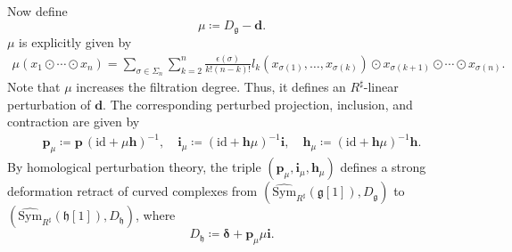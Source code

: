 \documentclass[12pt]{amsart}
\newtheorem{rmk}[defn]{Remark}
\numberwithin{equation}{section}
\theoremstyle{plain}
\newcommand{\bfd}{\mathbf{d}}
\newcommand{\bfi}{\mathbf{i}}
\newcommand{\bfh}{\mathbf{h}}
\newcommand{\bfp}{\mathbf{p}}
\newcommand{\bfdelta}{\bm{\delta}}
\newcommand{\fg}{\mathfrak{g}}
\newcommand{\fh}{\mathfrak{h}}
\newcommand{\Sym}{\mathrm{Sym}}
\newcommand{\Gr}{\mathrm{Gr}}
\newcommand{\id}{\mathrm{id}}
\newcommand{\wSym}{\widehat{\Sym}}
\newcommand{\uR}{{R^\sharp}}
\begin{document}
	Now define
	\[
	\mu \coloneqq D_\fg - \bfd.
	\]
	$\mu$ is explicitly given by
	\begin{align*}
		\mu(x_1 \odot \cdots \odot x_n)=
		\sum_{\sigma \in \Sigma_n} \sum_{k=2}^n 
		\frac{\epsilon(\sigma)}{k!(n-k)!}
		l_k(x_{\sigma(1)},\dots,x_{\sigma(k)})
		\odot x_{\sigma(k+1)} \odot \cdots \odot x_{\sigma(n)}.
  	\end{align*}
  	Note that $\mu$ increases the filtration degree. Thus, it defines an $\uR$-linear perturbation of $\bfd$. 
	The corresponding perturbed projection, inclusion, and contraction are given by
	\begin{align*}
		\bfp_\mu \coloneqq \bfp\,(\id + \mu \bfh)^{-1}, \quad
		\bfi_\mu \coloneqq (\id + \bfh \mu)^{-1}\bfi, \quad
		\bfh_\mu \coloneqq (\id + \bfh\mu)^{-1}\bfh.
	\end{align*}
	By homological perturbation theory,	the triple $(\bfp_\mu, \bfi_\mu, \bfh_\mu)$ defines a strong deformation retract of curved complexes from $(\wSym_\uR(\fg[1]), D_\fg)$ to $(\wSym_\uR(\fh[1]), D_\fh)$, where
	\[
	D_\fh \coloneqq \bfdelta + \bfp_\mu \mu \bfi.
	\]
	
\end{document}
